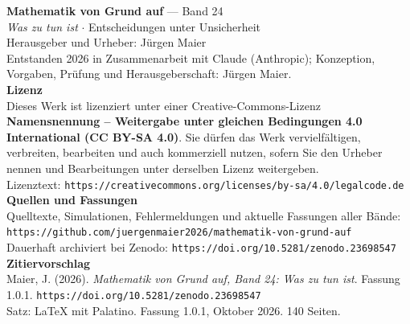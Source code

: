 \thispagestyle{empty}
\vspace*{\fill}
\begin{flushleft}
{\small\color{grau}
\textbf{\color{tief}Mathematik von Grund auf} --- Band 24\\[2pt]
\textit{Was zu tun ist} $\cdot$ Entscheidungen unter Unsicherheit\\[14pt]

Herausgeber und Urheber: Jürgen Maier\\[2pt]
Entstanden 2026 in Zusammenarbeit mit Claude (Anthropic); Konzeption, Vorgaben, Prüfung und Herausgeberschaft: Jürgen Maier.\\[14pt]

\textbf{Lizenz}\\[2pt]
Dieses Werk ist lizenziert unter einer Creative-Commons-Lizenz \textbf{Namensnennung -- Weitergabe unter gleichen Bedingungen 4.0 International (CC BY-SA 4.0)}. Sie dürfen das Werk vervielfältigen, verbreiten, bearbeiten und auch kommerziell nutzen, sofern Sie den Urheber nennen und Bearbeitungen unter derselben Lizenz weitergeben.\\[2pt]
Lizenztext: \texttt{https://creativecommons.org/licenses/by-sa/4.0/legalcode.de}\\[14pt]

\textbf{Quellen und Fassungen}\\[2pt]
Quelltexte, Simulationen, Fehlermeldungen und aktuelle Fassungen aller Bände:\\
\texttt{https://github.com/juergenmaier2026/mathematik-von-grund-auf}\\[2pt]
Dauerhaft archiviert bei Zenodo: \texttt{https://doi.org/10.5281/zenodo.23698547}\\[14pt]

\textbf{Zitiervorschlag}\\[2pt]
Maier, J. (2026). \textit{Mathematik von Grund auf, Band 24: Was zu tun ist}. Fassung 1.0.1. \texttt{https://doi.org/10.5281/zenodo.23698547}\\[14pt]

Satz: \LaTeX{} mit Palatino. Fassung 1.0.1, Oktober 2026. 140 Seiten.
}
\end{flushleft}
\vspace*{1.5cm}
